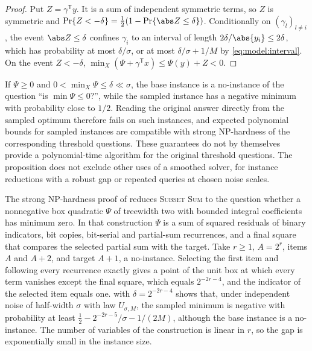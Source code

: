 \begin{proof}
Put $Z=\gamma^{\mathsf T}y$. It is a sum of independent symmetric terms, so
$Z$ is symmetric and $\Pr\{Z<-\delta\}=\frac12(1-\Pr\{\abs Z\le\delta\})$.
Conditionally on $(\gamma_l)_{l\ne i}$, the event $\abs Z\le\delta$ confines
$\gamma_i$ to an interval of length $2\delta/\abs{y_i}\le2\delta$, which has
probability at most $\delta/\sigma$, or at most $\delta/\sigma+1/M$ by
\eqref{eq:model:interval}. On the event $Z<-\delta$,
$\min_X(\Psi+\gamma^{\mathsf T}x)\le\Psi(y)+Z<0$.
\end{proof}

If $\Psi\ge0$ and $0<\min_X\Psi\le\delta\ll\sigma$, the base instance is a
no-instance of the question ``is $\min\Psi\le0$?'', while the sampled
instance has a negative minimum with probability close to $1/2$. Reading
the original answer directly from the sampled optimum therefore fails on
such instances, and expected polynomial bounds for sampled instances are
compatible with strong NP-hardness of the corresponding threshold
questions. These guarantees do not by themselves provide a polynomial-time
algorithm for the original threshold questions. The proposition does not
exclude other uses of a smoothed solver, for instance reductions with a
robust gap or repeated queries at chosen noise scales.

\begin{remark}\label{rem:lim:dk}
The strong NP-hardness proof of \citet{pia2026-treewidth-and-the-complexity-of}
reduces \textsc{Subset Sum} to the question whether a nonnegative box
quadratic $\Psi$ of treewidth two with bounded integral coefficients has
minimum zero. In that construction $\Psi$ is a sum of squared residuals of
binary indicators, bit copies, bit-serial and partial-sum recurrences, and a
final square that compares the selected partial sum with the target. Take
$r\ge1$, $A=2^r$, items $A$ and $A+2$, and target $A+1$, a no-instance. Selecting
the first item and following every recurrence exactly gives a point of the
unit box at which every term vanishes except the final square, which equals
$2^{-2r-4}$, and the indicator of the selected item equals one.
 with $\delta=2^{-2r-4}$ shows that, under
independent noise of half-width $\sigma$ with law $U_{\sigma,M}$, the sampled
minimum is negative with probability at least
$\frac12-2^{-2r-5}/\sigma-1/(2M)$, although the base instance is a
no-instance. The number of variables of the construction is linear in $r$,
so the gap is exponentially small in the instance size.
\end{remark}

